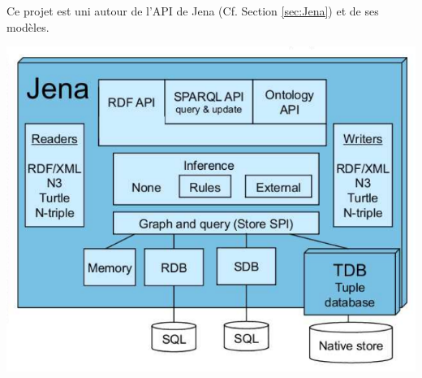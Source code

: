 \documentclass{article}
\begin{document}
Ce projet est uni autour de l'API de Jena (Cf. Section \ref{sec:Jena}) et de ses modèles.
\begin{center}
 

\includegraphics[scale=0.5]{archi_jena.jpeg} 
\label{fig_jena}
\end{center}
\end{document}
